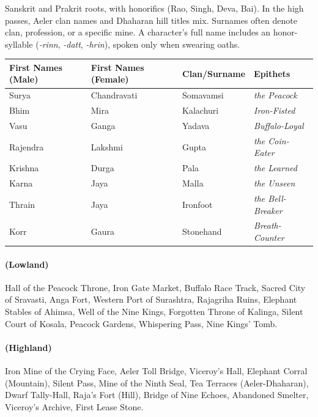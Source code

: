 Sanskrit and Prakrit roots, with honorifics (Rao, Singh, Deva, Bai). In the high passes, Aeler clan names and Dhaharan hill titles mix. Surnames often denote clan, profession, or a specific mine. A character's full name includes an honor-syllable (\textit{-rinn}, \textit{-datt}, \textit{-hrin}), spoken only when swearing oaths.

\begin{longtable}{|p{}|p{}|p{}|p{}|}
\hline
\textbf{First Names (Male)} & \textbf{First Names (Female)} & \textbf{Clan/Surname} & \textbf{Epithets} \\
\hline
Surya & Chandravati & Somavamsi & \textit{the Peacock} \\
\hline
Bhim & Mira & Kalachuri & \textit{Iron-Fisted} \\
\hline
Vasu & Ganga & Yadava & \textit{Buffalo-Loyal} \\
\hline
Rajendra & Lakshmi & Gupta & \textit{the Coin-Eater} \\
\hline
Krishna & Durga & Pala & \textit{the Learned} \\
\hline
Karna & Jaya & Malla & \textit{the Unseen} \\
\hline
Thrain & Jaya & Ironfoot & \textit{the Bell-Breaker} \\
\hline
Korr & Gaura & Stonehand & \textit{Breath-Counter} \\
\hline
\end{longtable}

\paragraph*{(Lowland)} Hall of the Peacock Throne, Iron Gate Market, Buffalo Race Track, Sacred City of Sravasti, Anga Fort, Western Port of Surashtra, Rajagriha Ruins, Elephant Stables of Ahimsa, Well of the Nine Kings, Forgotten Throne of Kalinga, Silent Court of Kosala, Peacock Gardens, Whispering Pass, Nine Kings' Tomb.

\paragraph*{(Highland)} Iron Mine of the Crying Face, Aeler Toll Bridge, Viceroy's Hall, Elephant Corral (Mountain), Silent Pass, Mine of the Ninth Seal, Tea Terraces (Aeler-Dhaharan), Dwarf Tally-Hall, Raja's Fort (Hill), Bridge of Nine Echoes, Abandoned Smelter, Viceroy's Archive, First Lease Stone.

